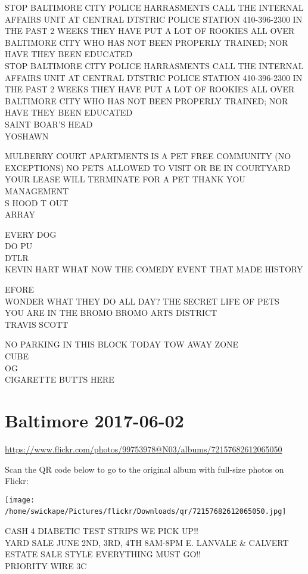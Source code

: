\documentclass[10pt,letterpaper]{article}
\begin{document}
STOP BALTIMORE CITY POLICE HARRASMENTS CALL THE INTERNAL AFFAIRS UNIT AT CENTRAL DTSTRIC POLICE STATION 410{-}396{-}2300 IN THE PAST 2 WEEKS THEY HAVE PUT A LOT OF ROOKIES ALL OVER BALTIMORE CITY WHO HAS NOT BEEN PROPERLY TRAINED; NOR HAVE THEY BEEN EDUCATED\\
STOP BALTIMORE CITY POLICE HARRASMENTS CALL THE INTERNAL AFFAIRS UNIT AT CENTRAL DTSTRIC POLICE STATION 410{-}396{-}2300 IN THE PAST 2 WEEKS THEY HAVE PUT A LOT OF ROOKIES ALL OVER BALTIMORE CITY WHO HAS NOT BEEN PROPERLY TRAINED; NOR HAVE THEY BEEN EDUCATED\\
SAINT BOAR'S HEAD\\
YOSHAWN

MULBERRY COURT APARTMENTS IS A PET FREE COMMUNITY (NO EXCEPTIONS) NO PETS ALLOWED TO VISIT OR BE IN COURTYARD YOUR LEASE WILL TERMINATE FOR A PET THANK YOU MANAGEMENT\\
S HOOD T OUT\\
ARRAY

EVERY DOG\\
DO PU\\
DTLR\\
KEVIN HART WHAT NOW THE COMEDY EVENT THAT MADE HISTORY

EFORE\\
WONDER WHAT THEY DO ALL DAY?  THE SECRET LIFE OF PETS\\
YOU ARE IN THE BROMO BROMO ARTS DISTRICT\\
TRAVIS SCOTT

NO PARKING IN THIS BLOCK TODAY TOW AWAY ZONE\\
CUBE\\
OG\\
CIGARETTE BUTTS HERE
\

\section*{Baltimore 2017-06-02}

\url{https://www.flickr.com/photos/99753978@N03/albums/72157682612065050}

Scan the QR code below to go to the original album with full-size photos on Flickr:

\texttt{[image: /home/swickape/Pictures/flickr/Downloads/qr/72157682612065050.jpg]}
\

CASH 4 DIABETIC TEST STRIPS WE PICK UP!!\\
YARD SALE JUNE 2ND, 3RD, 4TH 8AM{-}8PM E. LANVALE \& CALVERT ESTATE SALE STYLE EVERYTHING MUST GO!!\\
PRIORITY WIRE 3C
\end{document}
